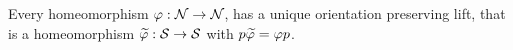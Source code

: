 Every homeomorphism $\varphi: \mathcal{N} \to \mathcal{N}$, has a unique orientation preserving lift, that is a homeomorphism $\widetilde{\varphi}: \mathcal{S} \to \mathcal{S}$ with $p\widetilde{\varphi}=\varphi p$.
%

